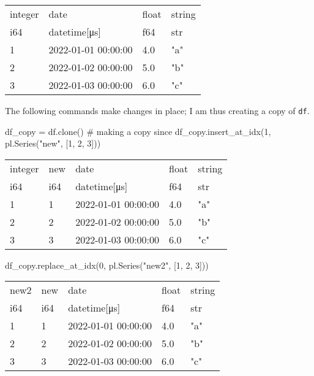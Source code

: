 \documentclass[
  letterpaper,
  DIV=11,
  numbers=noendperiod]{scrartcl}
\newenvironment{Shaded}{\begin{snugshade}}{\end{snugshade}}
\newcommand{\CommentTok}[1]{\textcolor[rgb]{0.37,0.37,0.37}{#1}}
\newcommand{\DecValTok}[1]{\textcolor[rgb]{0.68,0.00,0.00}{#1}}
\newcommand{\NormalTok}[1]{\textcolor[rgb]{0.00,0.23,0.31}{#1}}
\newcommand{\OperatorTok}[1]{\textcolor[rgb]{0.37,0.37,0.37}{#1}}
\newcommand{\StringTok}[1]{\textcolor[rgb]{0.13,0.47,0.30}{#1}}
\begin{document}
\begin{longtable}[]{@{}llll@{}}
\toprule()
integer & date & float & string \\
i64 & datetime{[}μs{]} & f64 & str \\
\midrule()
\endhead
1 & 2022-01-01 00:00:00 & 4.0 & "a" \\
2 & 2022-01-02 00:00:00 & 5.0 & "b" \\
3 & 2022-01-03 00:00:00 & 6.0 & "c" \\
\bottomrule()
\end{longtable}

The following commands make changes in place; I am thus creating a copy
of \texttt{df}.

\begin{Shaded}
\begin{Highlighting}[]
\NormalTok{df\_copy }\OperatorTok{=}\NormalTok{ df.clone() }\CommentTok{\# making a copy since }
\NormalTok{df\_copy.insert\_at\_idx(}\DecValTok{1}\NormalTok{, pl.Series(}\StringTok{"new"}\NormalTok{, [}\DecValTok{1}\NormalTok{, }\DecValTok{2}\NormalTok{, }\DecValTok{3}\NormalTok{])) }
\end{Highlighting}
\end{Shaded}

\begin{longtable}[]{@{}lllll@{}}
\toprule()
integer & new & date & float & string \\
i64 & i64 & datetime{[}μs{]} & f64 & str \\
\midrule()
\endhead
1 & 1 & 2022-01-01 00:00:00 & 4.0 & "a" \\
2 & 2 & 2022-01-02 00:00:00 & 5.0 & "b" \\
3 & 3 & 2022-01-03 00:00:00 & 6.0 & "c" \\
\bottomrule()
\end{longtable}

\begin{Shaded}
\begin{Highlighting}[]
\NormalTok{df\_copy.replace\_at\_idx(}\DecValTok{0}\NormalTok{, pl.Series(}\StringTok{"new2"}\NormalTok{, [}\DecValTok{1}\NormalTok{, }\DecValTok{2}\NormalTok{, }\DecValTok{3}\NormalTok{]))}
\end{Highlighting}
\end{Shaded}

\begin{longtable}[]{@{}lllll@{}}
\toprule()
new2 & new & date & float & string \\
i64 & i64 & datetime{[}μs{]} & f64 & str \\
\midrule()
\endhead
1 & 1 & 2022-01-01 00:00:00 & 4.0 & "a" \\
2 & 2 & 2022-01-02 00:00:00 & 5.0 & "b" \\
3 & 3 & 2022-01-03 00:00:00 & 6.0 & "c" \\
\bottomrule()
\end{longtable}
\end{document}
